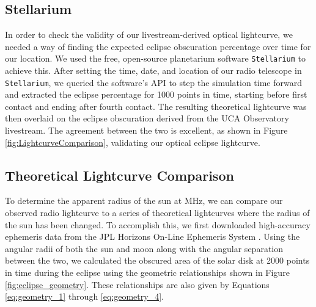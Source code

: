 \subsection{\label{sec:stellarium}Stellarium}

In order to check the validity of our livestream-derived optical lightcurve, we needed a way of finding the expected eclipse obscuration percentage over time for our location.
We used the free, open-source planetarium software \texttt{Stellarium}\cite{zotti_simulated_2020} to achieve this.
After setting the time, date, and location of our radio telescope in \texttt{Stellarium}, we queried the software's API to step the simulation time forward and extracted the eclipse percentage for 1000 points in time, starting before first contact and ending after fourth contact.
The resulting theoretical lightcurve was then overlaid on the eclipse obscuration derived from the UCA Observatory livestream.
The agreement between the two is excellent, as shown in Figure \ref{fig:LightcurveComparison}, validating our optical eclipse lightcurve.

\subsection{\label{sec:theoreticalLightcurves}Theoretical Lightcurve Comparison}

To determine the apparent radius of the sun at \unit[1420]{MHz}, we can compare our observed radio lightcurve to a series of theoretical lightcurves where the radius of the sun has been changed.
To accomplish this, we first downloaded high-accuracy ephemeris data from the JPL Horizons On-Line Ephemeris System \cite{nasa_jpl_solar_system_dynamics_group_jpl_nodate}. 
Using the angular radii of both the sun and moon along with the angular separation between the two, we calculated the obscured area of the solar disk at 2000 points in time during the eclipse using the geometric relationships shown in Figure \ref{fig:eclipse_geometry}.
These relationships are also given by Equations \ref{eq:geometry_1} through \ref{eq:geometry_4}.

